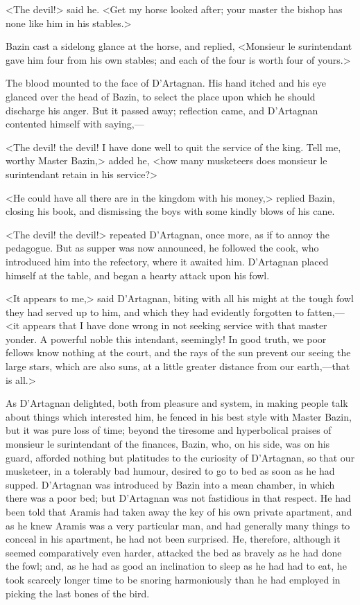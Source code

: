 <The devil!> said he. <Get my horse looked after; your master the bishop has none like him in his stables.>

Bazin cast a sidelong glance at the horse, and replied, <Monsieur le surintendant gave him four from his own stables; and each of the four is worth four of yours.>

The blood mounted to the face of D'Artagnan. His hand itched and his eye glanced over the head of Bazin, to select the place upon which he should discharge his anger. But it passed away; reflection came, and D'Artagnan contented himself with saying,—

<The devil! the devil! I have done well to quit the service of the king. Tell me, worthy Master Bazin,> added he, <how many musketeers does monsieur le surintendant retain in his service?>

<He could have all there are in the kingdom with his money,> replied Bazin, closing his book, and dismissing the boys with some kindly blows of his cane.

<The devil! the devil!> repeated D'Artagnan, once more, as if to annoy the pedagogue. But as supper was now announced, he followed the cook, who introduced him into the refectory, where it awaited him. D'Artagnan placed himself at the table, and began a hearty attack upon his fowl.

<It appears to me,> said D'Artagnan, biting with all his might at the tough fowl they had served up to him, and which they had evidently forgotten to fatten,—<it appears that I have done wrong in not seeking service with that master yonder. A powerful noble this intendant, seemingly! In good truth, we poor fellows know nothing at the court, and the rays of the sun prevent our seeing the large stars, which are also suns, at a little greater distance from our earth,—that is all.>

As D'Artagnan delighted, both from pleasure and system, in making people talk about things which interested him, he fenced in his best style with Master Bazin, but it was pure loss of time; beyond the tiresome and hyperbolical praises of monsieur le surintendant of the finances, Bazin, who, on his side, was on his guard, afforded nothing but platitudes to the curiosity of D'Artagnan, so that our musketeer, in a tolerably bad humour, desired to go to bed as soon as he had supped. D'Artagnan was introduced by Bazin into a mean chamber, in which there was a poor bed; but D'Artagnan was not fastidious in that respect. He had been told that Aramis had taken away the key of his own private apartment, and as he knew Aramis was a very particular man, and had generally many things to conceal in his apartment, he had not been surprised. He, therefore, although it seemed comparatively even harder, attacked the bed as bravely as he had done the fowl; and, as he had as good an inclination to sleep as he had had to eat, he took scarcely longer time to be snoring harmoniously than he had employed in picking the last bones of the bird.

